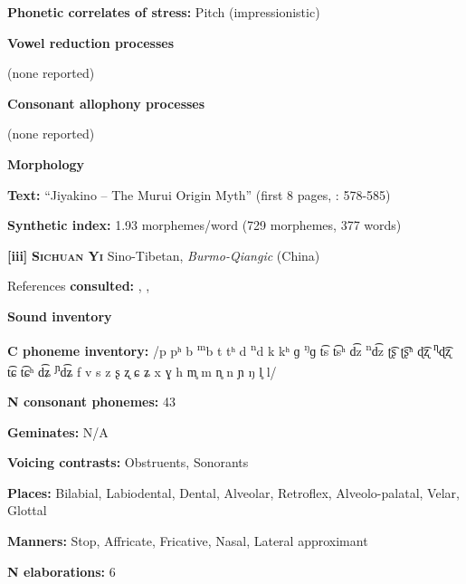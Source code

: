 \textbf{Phonetic correlates of stress:} Pitch (impressionistic)



\textbf{Vowel reduction processes}



(none reported)



\textbf{Consonant allophony processes}



(none reported)



\textbf{Morphology}



\textbf{Text:} “Jiyakino -- The Murui Origin Myth” (first 8 pages, \citealt{Wojtylak2017}: 578-585)



\textbf{Synthetic index:} 1.93 morphemes/word (729 morphemes, 377 words)



\textbf{[iii]}   \textbf{\textsc{Sichuan Yi}}  Sino-Tibetan, \textit{Burmo-Qiangic} (China)



References \textbf{consulted:} \citet{Gerner2013}, \citet{Maoji1997}, \citet{Merrifield2012}



\textbf{Sound inventory}



\textbf{C phoneme inventory:} /p pʰ b \textsuperscript{m}b t tʰ d \textsuperscript{n}d k kʰ ɡ \textsuperscript{ŋ}ɡ t͡s t͡sʰ d͡z \textsuperscript{n}d͡z ʈ͡ʂ ʈ͡ʂʰ ɖ͡ʐ \textsuperscript{ɳ}ɖ͡ʐ t͡ɕ t͡ɕʰ d͡ʑ \textsuperscript{ɲ}d͡ʑ f v s z ʂ ʐ ɕ ʑ x ɣ h m̥ m n̥ n ɲ ŋ l̥ l/



\textbf{N consonant phonemes:} 43



\textbf{Geminates:} N/A



\textbf{Voicing contrasts:} Obstruents, Sonorants



\textbf{Places:} Bilabial, Labiodental, Dental, Alveolar, Retroflex, Alveolo-palatal, Velar, Glottal



\textbf{Manners:} Stop, Affricate, Fricative, Nasal, Lateral approximant



\textbf{N elaborations:} 6



